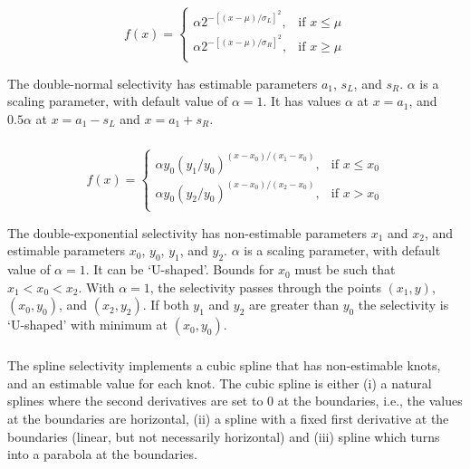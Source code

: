 \subsubsection[Double-normal]{}

\begin{equation}
  f(x) = \begin{cases}
    \alpha 2^{-[(x- \mu)/\sigma_L ]^2}, & \text{if $x \leq \mu$} \\
    \alpha 2^{-[(x- \mu)/\sigma_R ]^2}, & \text{if $x \ge \mu$}\\
  \end{cases}
\end{equation} 

The double-normal selectivity has estimable parameters $a_1$, $s_L$, and $s_R$. $\alpha$ is a scaling parameter, with default value of $\alpha = 1$. It has values $\alpha$ at $x=a_1$, and $0.5 \alpha$ at $x=a_1-s_L$ and $x=a_1+s_R$. 

\subsubsection[Double-exponential]{}

\begin{equation} 
f(x)=\begin{cases}
	  \alpha y_0(y_1 / y_0)^{(x-x_0)/(x_1-x_0)}, & \text{if $x \le x_0$} \\
	  \alpha y_0(y_2 / y_0)^{(x-x_0)/(x_2-x_0)}, & \text{if $x > x_0$} \\
  \end{cases}
\end{equation}

The double-exponential selectivity has non-estimable parameters $x_1$ and $x_2$, and estimable parameters $x_0$, $y_0$, $y_1$, and $y_2$.  $\alpha$ is a scaling parameter, with default value of $\alpha = 1$. It can be `U-shaped'. Bounds for $x_0$ must be such that $x_1 < x_0 < x_2$. With $\alpha=1$, the selectivity passes through the points $(x_1, y)$, $(x_0, y_0)$, and $(x_2, y_2)$. If both $y_1$ and $y_2$ are greater than $y_0$ the selectivity is `U-shaped' with minimum at $(x_0, y_0)$.

\subsubsection[Spline]{}

The spline selectivity implements a cubic spline that has non-estimable knots, and an estimable value for each knot. The cubic spline is either (i) a natural splines where the second derivatives are set to 0 at the boundaries, i.e., the values at the boundaries are horizontal, (ii) a spline with a fixed first derivative at the boundaries (linear, but not necessarily horizontal) and (iii) spline which turns into a parabola at the boundaries.







